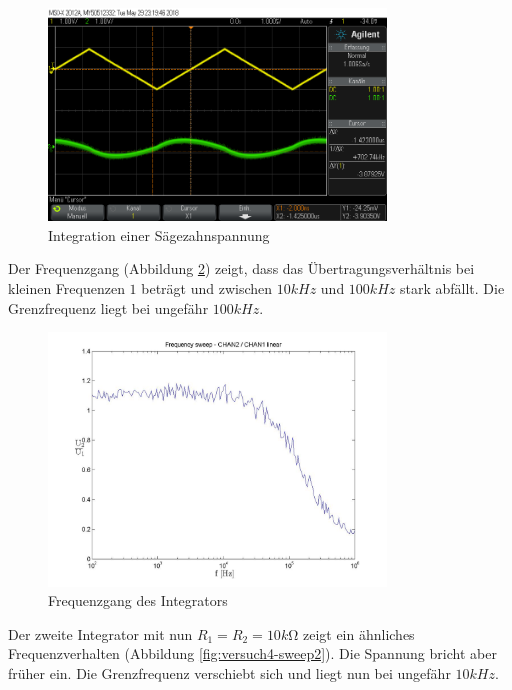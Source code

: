 \documentclass[a4paper]{article}
\begin{document}
\begin{figure}[H]
    \centering
    \includegraphics[width=0.8\textwidth]{versuch4/versuch4_saegezahn.png}
    \caption{Integration einer Sägezahnspannung}
    \label{fig:versuch4-dreieck}
\end{figure}

Der Frequenzgang (Abbildung \ref{fig:versuch4-sweep1}) zeigt, dass das Übertragungsverhältnis bei kleinen Frequenzen $1$ beträgt und zwischen $10\si{kHz}$ und $100\si{kHz}$ stark abfällt. Die Grenzfrequenz liegt bei ungefähr $100\si{kHz}$.

\begin{figure}[H]
    \centering
    \includegraphics[width=0.8\textwidth]{versuch4/versuch4_sweep1_frequencysweep_ylinxlog.jpg}
    \caption{Frequenzgang des Integrators}
    \label{fig:versuch4-sweep1}
\end{figure}

Der zweite Integrator mit nun $R_1=R_2=10\si{k\ohm}$ zeigt ein ähnliches Frequenzverhalten (Abbildung \ref{fig:versuch4-sweep2}). Die Spannung bricht aber früher ein. Die Grenzfrequenz verschiebt sich und liegt nun bei ungefähr $10\si{kHz}$.
\end{document}
